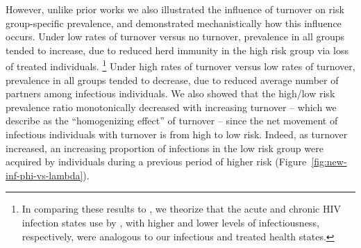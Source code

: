However, unlike prior works %
we also illustrated the influence of turnover on
risk group-specific prevalence, and demonstrated mechanistically how this influence occurs.  %
Under low rates of turnover versus no turnover,
prevalence in all groups tended to increase, due to
reduced herd immunity in the high risk group
via loss of treated individuals.%
\footnote{
  In comparing these results to \citep{Zhang2012},
  we theorize that the acute and chronic HIV infection states use by \citeauthor{Zhang2012},
  with higher and lower levels of infectiousness, respectively,
  were analogous to our infectious and treated health states.}
Under high rates of turnover versus low rates of turnover,
prevalence in all groups tended to decrease, due to
reduced average number of partners among infectious individuals.
We also showed that the high/low risk prevalence ratio
monotonically decreased with increasing turnover
-- which we describe as the ``homogenizing effect'' of turnover --
since the net movement of infectious individuals with turnover is
from high to low risk.
Indeed, as turnover increased,
an increasing proportion of infections in the low risk group
were acquired by individuals during a previous period of higher risk
(Figure~\ref{fig:new-inf-phi-vs-lambda}).
